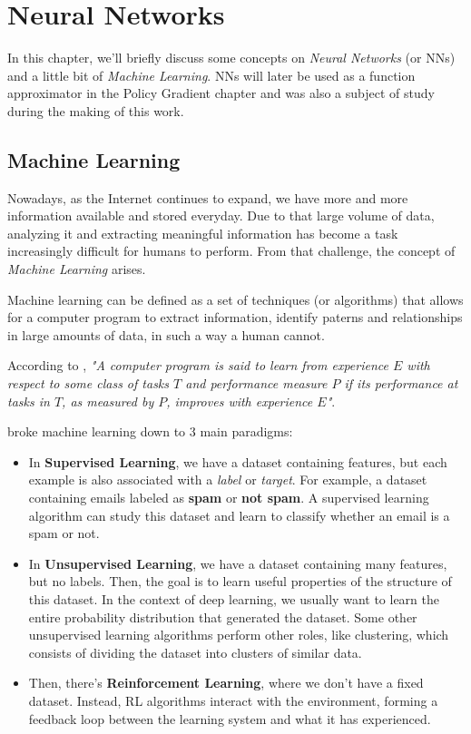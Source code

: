 
\chapter{Neural Networks}

In this chapter, we'll briefly discuss some concepts on \textit{Neural Networks} (or NNs) and a little bit of \textit{Machine Learning}. NNs will later be used as a function approximator in the Policy Gradient chapter and was also a subject of study during the making of this work.

\section{Machine Learning}
Nowadays, as the Internet continues to expand, we have more and more information available and stored everyday. Due to that large volume of data, analyzing it and extracting meaningful information has become a task increasingly difficult for humans to perform. From that challenge, the concept of \textit{Machine Learning} arises.

Machine learning can be defined as a set of techniques (or algorithms) that allows for a computer program to extract information, identify paterns and relationships in large amounts of data, in such a way a human cannot.

According to \cite{Mitchell}, \textit{"A computer program is said to learn from experience $E$ with respect to some class of tasks $T$ and performance measure $P$ if its performance at tasks in $T$, as measured by $P$, improves with experience $E$"}.

\cite{Goodfellow-et-al-2016} broke machine learning down to 3 main paradigms:
\begin{itemize}
    \item In \textbf{Supervised Learning}, we have a dataset containing features, but each example is also associated with a \textit{label} or \textit{target}. For example, a dataset containing emails labeled as \textbf{spam} or \textbf{not spam}. A supervised learning algorithm can study this dataset and learn to classify whether an email is a spam or not.
    \item In \textbf{Unsupervised Learning}, we have a dataset containing many features, but no labels. Then, the goal is to learn useful properties of the structure of this dataset. In the context of deep learning, we usually want to learn the entire probability distribution that generated the dataset. Some other unsupervised learning algorithms perform other roles, like clustering, which consists of dividing the dataset into clusters of similar data.
    \item Then, there's \textbf{Reinforcement Learning}, where we don't have a fixed dataset. Instead, RL algorithms interact with the environment, forming a feedback loop between the learning system and what it has experienced.
\end{itemize}

